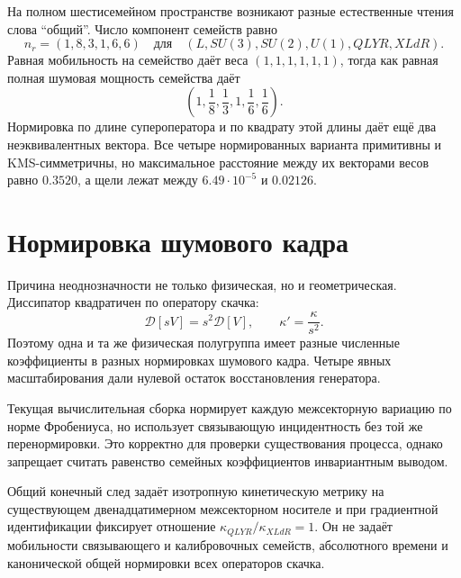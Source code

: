 На полном шестисемейном пространстве возникают разные естественные чтения
слова ``общий''. Число компонент семейств равно
\begin{equation}
 n_r=(1,8,3,1,6,6)
 \quad\text{для}\quad
 (L,SU(3),SU(2),U(1),QLYR,XLdR).
 \label{eq:v8-noise-family-component-counts}
\end{equation}
Равная мобильность на семейство даёт веса $(1,1,1,1,1,1)$, тогда как
равная полная шумовая мощность семейства даёт
\begin{equation}
 \left(1,\frac18,\frac13,1,\frac16,\frac16\right).
 \label{eq:v8-equal-total-noise-power-weights}
\end{equation}
Нормировка по длине супероператора и по квадрату этой длины даёт ещё два
неэквивалентных вектора. Все четыре нормированных варианта примитивны и
KMS-симметричны, но максимальное расстояние между их векторами весов равно
$0.3520$, а щели лежат между $6.49\cdot10^{-5}$ и $0.02126$.

\section{Нормировка шумового кадра}

Причина неоднозначности не только физическая, но и геометрическая.
Диссипатор квадратичен по оператору скачка:
\begin{equation}
 \mathcal D[sV]=s^2\mathcal D[V],
 \qquad
 \kappa' =\frac{\kappa}{s^2}.
 \label{eq:v8-noise-frame-rescaling}
\end{equation}
Поэтому одна и та же физическая полугруппа имеет разные численные
коэффициенты в разных нормировках шумового кадра. Четыре явных
масштабирования дали нулевой остаток восстановления генератора.

Текущая вычислительная сборка нормирует каждую межсекторную вариацию по норме
Фробениуса, но использует связывающую инцидентность без той же перенормировки.
Это корректно для проверки существования процесса, однако запрещает
считать равенство семейных коэффициентов инвариантным выводом.

\begin{theorem}
Общий конечный след задаёт изотропную кинетическую метрику на существующем
двенадцатимерном межсекторном носителе и при градиентной идентификации фиксирует
отношение $\kappa_{QLYR}/\kappa_{XLdR}=1$. Он не задаёт мобильности связывающего
и калибровочных семейств, абсолютного времени и канонической общей нормировки всех
операторов скачка.
\end{theorem}

